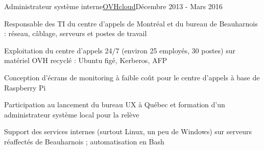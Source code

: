 \begin{joblong}{Administrateur système interne}{\href{https://www.ovhcloud.com}{OVHcloud}}{Décembre 2013 - Mars 2016}
\item Responsable des TI du centre d'appels de Montréal et du bureau de Beauharnois : réseau, câblage, serveurs et postes de travail
\item Exploitation du centre d'appels 24/7 (environ 25 employés, 30 postes) sur matériel OVH recyclé : Ubuntu figé, Kerberos, AFP
\item Conception d'écrans de monitoring à faible coût pour le centre d'appels à base de Raspberry Pi
\item Participation au lancement du bureau UX à Québec et formation d'un administrateur système local pour la relève
\item Support des services internes (surtout Linux, un peu de Windows) sur serveurs réaffectés de Beauharnois ; automatisation en Bash
\end{joblong}
